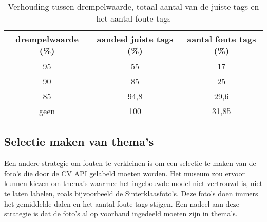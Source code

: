 \begin{table}
	\centering
	\begin{tabular}{ccc}
		\toprule
		drempelwaarde (\%) & aandeel juiste tags (\%) & aantal foute tags (\%) \\
        \midrule
		95 & 55 & 17 \\
        [\smallskipamount]
		90 & 85 & 25 \\
        [\smallskipamount]
		85 & 94,8 & 29,6 \\
        [\smallskipamount]
		geen & 100 & 31,85 \\
		\bottomrule
	\end{tabular}
	\caption{Verhouding tussen drempelwaarde, totaal aantal van de juiste tags en het aantal foute tags}
	\label{tab:instellen-drempelwaarde}
\end{table}

\subsection{Selectie maken van thema’s}

Een andere strategie om fouten te verkleinen is om een selectie te maken van de foto’s die door de CV API gelabeld moeten worden. Het museum zou ervoor kunnen kiezen om thema’s waarmee het ingebouwde model niet vertrouwd is, niet te laten labelen, zoals bijvoorbeeld de Sinterklaasfoto’s. Deze foto’s doen immers het gemiddelde dalen en het aantal foute tags stijgen. Een nadeel aan deze strategie is dat de foto’s al op voorhand ingedeeld moeten zijn in thema’s.